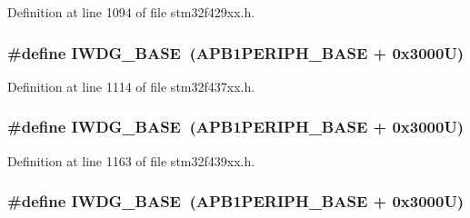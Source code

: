 Definition at line 1094 of file stm32f429xx.\+h.

\subsubsection[{\texorpdfstring{I\+W\+D\+G\+\_\+\+B\+A\+SE}{IWDG_BASE}}]{\setlength{\rightskip}{0pt plus 5cm}\#define I\+W\+D\+G\+\_\+\+B\+A\+SE~({\bf A\+P\+B1\+P\+E\+R\+I\+P\+H\+\_\+\+B\+A\+SE} + 0x3000\+U)}\hypertarget{group___peripheral__memory__map_ga8543ee4997296af5536b007cd4748f55}{}\label{group___peripheral__memory__map_ga8543ee4997296af5536b007cd4748f55}


Definition at line 1114 of file stm32f437xx.\+h.

\subsubsection[{\texorpdfstring{I\+W\+D\+G\+\_\+\+B\+A\+SE}{IWDG_BASE}}]{\setlength{\rightskip}{0pt plus 5cm}\#define I\+W\+D\+G\+\_\+\+B\+A\+SE~({\bf A\+P\+B1\+P\+E\+R\+I\+P\+H\+\_\+\+B\+A\+SE} + 0x3000\+U)}\hypertarget{group___peripheral__memory__map_ga8543ee4997296af5536b007cd4748f55}{}\label{group___peripheral__memory__map_ga8543ee4997296af5536b007cd4748f55}


Definition at line 1163 of file stm32f439xx.\+h.

\subsubsection[{\texorpdfstring{I\+W\+D\+G\+\_\+\+B\+A\+SE}{IWDG_BASE}}]{\setlength{\rightskip}{0pt plus 5cm}\#define I\+W\+D\+G\+\_\+\+B\+A\+SE~({\bf A\+P\+B1\+P\+E\+R\+I\+P\+H\+\_\+\+B\+A\+SE} + 0x3000\+U)}\hypertarget{group___peripheral__memory__map_ga8543ee4997296af5536b007cd4748f55}{}\label{group___peripheral__memory__map_ga8543ee4997296af5536b007cd4748f55}


